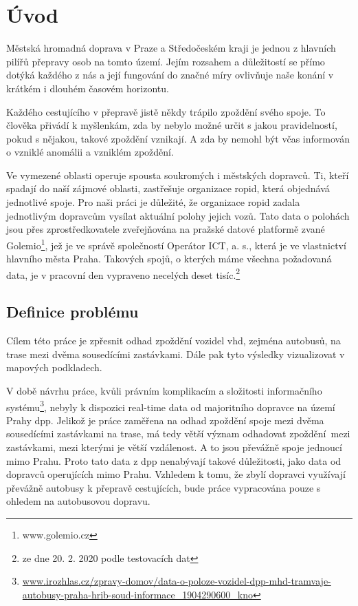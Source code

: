 \chapter*{Úvod}

Městská hromadná doprava v Praze a Středočeském kraji je jednou z hlavních pilířů přepravy osob na tomto území. Jejím rozsahem a důležitostí se přímo dotýká každého z nás a její fungování do značné míry ovlivňuje naše konání v krátkém i dlouhém časovém horizontu.

\bigbreak

Každého cestujícího v přepravě jistě někdy trápilo zpoždění svého spoje. To člověka přivádí k myšlenkám, zda by nebylo možné určit s jakou pravidelností, pokud s nějakou, takové zpoždění vznikají. A zda by nemohl být včas informován o vzniklé anomálii a vzniklém zpoždění.

\bigbreak

Ve vymezené oblasti operuje spousta soukromých i městských dopravců. Ti, kteří spadají do naší zájmové oblasti, zastřešuje organizace \gls{ropid}, která objednává jednotlivé spoje. Pro naši práci je důležité, že organizace \gls{ropid} zadala jednotlivým dopravcům vysílat aktuální polohy jejich vozů. Tato data o polohách jsou přes zprostředkovatele zveřejňována na pražské datové platformě zvané Golemio\footnote{www.golemio.cz}, jež je ve správě společností Operátor ICT, a. s., která je ve vlastnictví hlavního města Praha. Takových spojů, o kterých máme všechna požadovaná data, je v pracovní den vypraveno necelých deset tisíc.\footnote{ze dne 20. 2. 2020 podle testovacích dat}

\section*{Definice problému}

Cílem této práce je zpřesnit odhad zpoždění vozidel \gls{vhd}, zejména autobusů, na trase mezi dvěma sousedícími zastávkami. Dále pak tyto výsledky vizualizovat v mapových podkladech.


\bigbreak

V době návrhu práce, kvůli právním komplikacím a složitosti informačního systému\footnote{\url{www.irozhlas.cz/zpravy-domov/data-o-poloze-vozidel-dpp-mhd-tramvaje-autobusy-praha-hrib-soud-informace_1904290600_kno}}, nebyly k dispozici real-time data od majoritního dopravce na území Prahy \gls{dpp}. Jelikož je práce zaměřena na odhad zpoždění spoje mezi dvěma sousedícími zastávkami na trase, má tedy větší význam odhadovat zpoždění mezi zastávkami, mezi kterými je větší vzdálenost. A to jsou převážně spoje jednoucí mimo Prahu. Proto tato data z \gls{dpp} nenabývají takové důležitosti, jako data od dopravců operujících mimo Prahu. Vzhledem k tomu, že zbylí dopravci využívají převážně autobusy k přepravě cestujících, bude práce vypracována pouze s ohledem na autobusovou dopravu.

